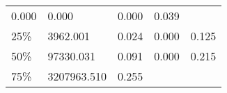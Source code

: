\documentclass[
  10pt,
  a4paper,
,tablecaptionabove
]{scrartcl}
\begin{document}
\begin{longtable}[]{@{}lllll@{}}
\begin{minipage}[t]{0.20\columnwidth}
0.000\strut
\end{minipage} & \begin{minipage}[t]{0.13\columnwidth}\raggedright
0.000\strut
\end{minipage} & \begin{minipage}[t]{0.15\columnwidth}\raggedright
0.000\strut
\end{minipage} & \begin{minipage}[t]{0.15\columnwidth}\raggedright
0.039\strut
\end{minipage}\tabularnewline
\begin{minipage}[t]{0.11\columnwidth}\raggedright
25\%\strut
\end{minipage} & \begin{minipage}[t]{0.20\columnwidth}\raggedright
3962.001\strut
\end{minipage} & \begin{minipage}[t]{0.13\columnwidth}\raggedright
0.024\strut
\end{minipage} & \begin{minipage}[t]{0.15\columnwidth}\raggedright
0.000\strut
\end{minipage} & \begin{minipage}[t]{0.15\columnwidth}\raggedright
0.125\strut
\end{minipage}\tabularnewline
\begin{minipage}[t]{0.11\columnwidth}\raggedright
50\%\strut
\end{minipage} & \begin{minipage}[t]{0.20\columnwidth}\raggedright
97330.031\strut
\end{minipage} & \begin{minipage}[t]{0.13\columnwidth}\raggedright
0.091\strut
\end{minipage} & \begin{minipage}[t]{0.15\columnwidth}\raggedright
0.000\strut
\end{minipage} & \begin{minipage}[t]{0.15\columnwidth}\raggedright
0.215\strut
\end{minipage}\tabularnewline
\begin{minipage}[t]{0.11\columnwidth}\raggedright
75\%\strut
\end{minipage} & \begin{minipage}[t]{0.20\columnwidth}\raggedright
3207963.510\strut
\end{minipage} & \begin{minipage}[t]{0.13\columnwidth}\raggedright
0.255\strut

\end{minipage}
\end{longtable}
\end{document}
